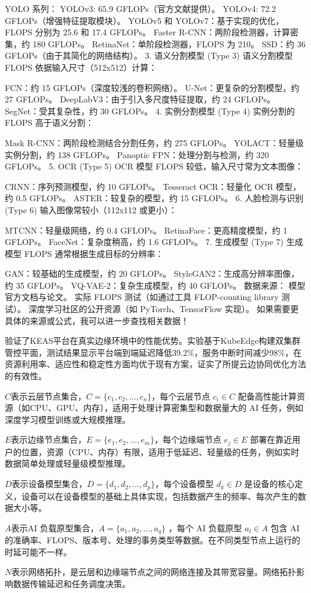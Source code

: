 YOLO 系列：
YOLOv3: 65.9 GFLOPs（官方文献提供）。
YOLOv4: 72.2 GFLOPs（增强特征提取模块）。
YOLOv5 和 YOLOv7：基于实现的优化，FLOPS 分别为 25.6 和 17.4 GFLOPs。
Faster R-CNN：两阶段检测器，计算密集，约 180 GFLOPs。
RetinaNet：单阶段检测器，FLOPS 为 210。
SSD：约 36 GFLOPs（由于其简化的网络结构）。
3. 语义分割模型 (Type 3)
语义分割模型 FLOPS 依据输入尺寸（512x512）计算：

FCN：约 15 GFLOPs（深度较浅的卷积网络）。
U-Net：更复杂的分割模型，约 27 GFLOPs。
DeepLabV3：由于引入多尺度特征提取，约 24 GFLOPs。
SegNet：受其复杂性，约 30 GFLOPs。
4. 实例分割模型 (Type 4)
实例分割的 FLOPS 高于语义分割：

Mask R-CNN：两阶段检测结合分割任务，约 275 GFLOPs。
YOLACT：轻量级实例分割，约 138 GFLOPs。
Panoptic FPN：处理分割与检测，约 320 GFLOPs。
5. OCR (Type 5)
OCR 模型 FLOPS 较低，输入尺寸常为文本图像：

CRNN：序列预测模型，约 10 GFLOPs。
Tesseract OCR：轻量化 OCR 模型，约 0.5 GFLOPs。
ASTER：较复杂的模型，约 15 GFLOPs。
6. 人脸检测与识别 (Type 6)
输入图像常较小（112x112 或更小）：

MTCNN：轻量级网络，约 0.4 GFLOPs。
RetinaFace：更高精度模型，约 1 GFLOPs。
FaceNet：复杂度稍高，约 1.6 GFLOPs。
7. 生成模型 (Type 7)
生成模型 FLOPS 通常根据生成目标的分辨率：

GAN：较基础的生成模型，约 20 GFLOPs。
StyleGAN2：生成高分辨率图像，约 35 GFLOPs。
VQ-VAE-2：复杂生成模型，约 40 GFLOPs。
数据来源：
模型官方文档与论文。
实际 FLOPS 测试（如通过工具 FLOP-counting library 测试）。
深度学习社区的公开资源（如 PyTorch、TensorFlow 实现）。
如果需要更具体的来源或公式，我可以进一步查找相关数据！


验证了KEAS平台在真实边缘环境中的性能优势。实验基于KubeEdge构建双集群管控平面，测试结果显示平台端到端延迟降低39.2\%，服务中断时间减少98\%，在资源利用率、适应性和稳定性方面均优于现有方案，证实了所提云边协同优化方法的有效性。


\item \( C \)表示云层节点集合，\( C = \{ c_1, c_2, \ldots, c_n \} \)，每个云层节点 \( c_i \in C \) 配备高性能计算资源（如CPU、GPU、内存），适用于处理计算密集型和数据量大的 AI 任务，例如深度学习模型训练或大规模推理。
    \item \( E \)表示边缘节点集合，\( E = \{ e_1, e_2, \ldots, e_m \} \)，每个边缘端节点 \( e_j \in E \) 部署在靠近用户的位置，资源（CPU、内存）有限，适用于低延迟、轻量级的任务，例如实时数据简单处理或轻量级模型推理。
    \item \( D \)表示设备模型集合，\( D = \{ d_1, d_2, \ldots, d_p \} \)，每个设备模型 \( d_k \in D \) 是设备的核心定义，设备可以在设备模型的基础上具体实现，包括数据产生的频率、每次产生的数据大小等。
    \item \( A \)表示AI 负载原型集合，\( A = \{ a_1, a_2, \ldots, a_q \} \) ，每个 AI 负载原型 \( a_l \in A \) 包含 AI 的准确率、FLOPS、版本号、处理的事务类型等数据。在不同类型节点上运行的时延可能不一样。
    \item \( N \)表示网络拓扑，是云层和边缘端节点之间的网络连接及其带宽容量。网络拓扑影响数据传输延迟和任务调度决策。


